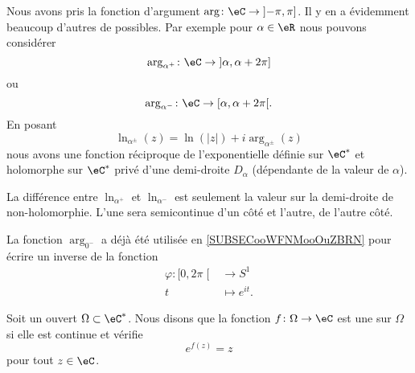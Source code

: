 \begin{normaltext}      \label{NORMooFCDOooFDzAjp}
	Nous avons pris la fonction d'argument \( \arg\colon \eC\to \mathopen] -\pi , \pi \mathclose]\). Il y en a évidemment beaucoup d'autres de possibles. Par exemple pour \( \alpha\in \eR\) nous pouvons considérer
	\begin{equation}        \label{EQooNKKDooOuJxXe}
		\arg_{\alpha^+}\colon \eC\to \mathopen] \alpha , \alpha+2\pi \mathclose]
	\end{equation}
	ou
	\begin{equation}
		\arg_{\alpha^-}\colon \eC\to \mathopen[ \alpha , \alpha+2\pi \mathclose[.
	\end{equation}
	En posant
	\begin{equation}
		\ln_{\alpha^{\pm}}(z)=\ln(| z |)+i\arg_{\alpha^{\pm}}(z)
	\end{equation}
	nous avons une fonction réciproque de l'exponentielle définie sur \( \eC^*\) et holomorphe sur \( \eC^*\) privé d'une demi-droite \( D_{\alpha}\) (dépendante de la valeur de \( \alpha\)).
\end{normaltext}

La différence entre \( \ln_{\alpha^+}\) et \( \ln_{\alpha^-}\) est seulement la valeur sur la demi-droite de non-holomorphie. L'une sera semicontinue d'un côté et l'autre, de l'autre côté.

\begin{remark}
	La fonction \( \arg_{0^-}\) a déjà été utilisée en \ref{SUBSECooWFNMooOuZBRN} pour écrire un inverse de la fonction
	\begin{equation}
		\begin{aligned}
			\varphi\colon \mathopen[ 0 , 2\pi \mathclose[ & \to S^1          \\
			t                                             & \mapsto  e^{it}.
		\end{aligned}
	\end{equation}
\end{remark}

\begin{definition}
	Soit un ouvert \( \Omega\subset \eC^*\). Nous disons que la fonction \( f\colon \Omega\to \eC\) est une  sur \( \Omega\) si elle est continue et vérifie
	\begin{equation}
		e^{f(z)}=z
	\end{equation}
	pour tout \( z\in \eC\).
\end{definition}

